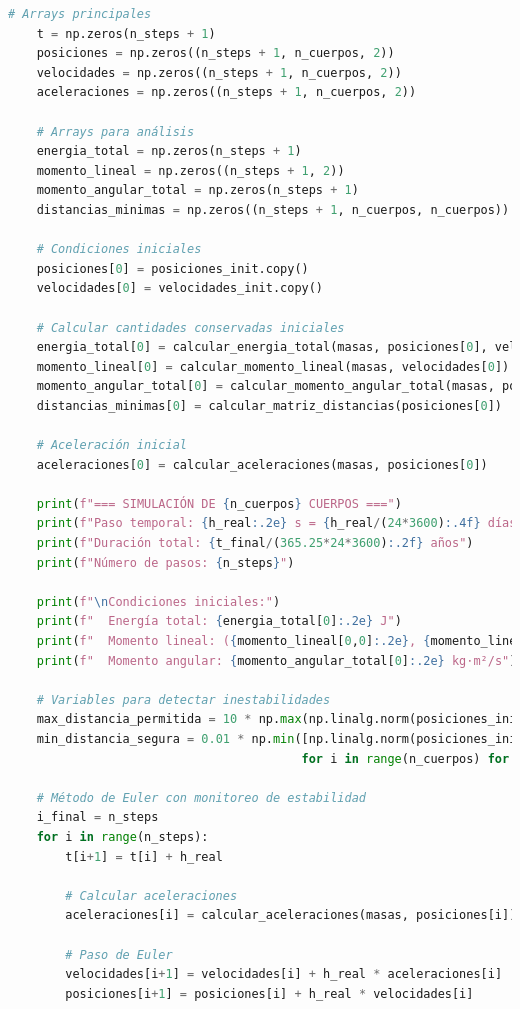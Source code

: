 \documentclass{article}
\begin{document}
\begin{lstlisting}[language=Python, caption={Sistema completo de 4 cuerpos con análisis dinámico}]
    # Arrays principales
    t = np.zeros(n_steps + 1)
    posiciones = np.zeros((n_steps + 1, n_cuerpos, 2))
    velocidades = np.zeros((n_steps + 1, n_cuerpos, 2))
    aceleraciones = np.zeros((n_steps + 1, n_cuerpos, 2))
    
    # Arrays para análisis
    energia_total = np.zeros(n_steps + 1)
    momento_lineal = np.zeros((n_steps + 1, 2))
    momento_angular_total = np.zeros(n_steps + 1)
    distancias_minimas = np.zeros((n_steps + 1, n_cuerpos, n_cuerpos))
    
    # Condiciones iniciales
    posiciones[0] = posiciones_init.copy()
    velocidades[0] = velocidades_init.copy()
    
    # Calcular cantidades conservadas iniciales
    energia_total[0] = calcular_energia_total(masas, posiciones[0], velocidades[0])
    momento_lineal[0] = calcular_momento_lineal(masas, velocidades[0])
    momento_angular_total[0] = calcular_momento_angular_total(masas, posiciones[0], velocidades[0])
    distancias_minimas[0] = calcular_matriz_distancias(posiciones[0])
    
    # Aceleración inicial
    aceleraciones[0] = calcular_aceleraciones(masas, posiciones[0])
    
    print(f"=== SIMULACIÓN DE {n_cuerpos} CUERPOS ===")
    print(f"Paso temporal: {h_real:.2e} s = {h_real/(24*3600):.4f} días")
    print(f"Duración total: {t_final/(365.25*24*3600):.2f} años")
    print(f"Número de pasos: {n_steps}")
    
    print(f"\nCondiciones iniciales:")
    print(f"  Energía total: {energia_total[0]:.2e} J")
    print(f"  Momento lineal: ({momento_lineal[0,0]:.2e}, {momento_lineal[0,1]:.2e}) kg⋅m/s")
    print(f"  Momento angular: {momento_angular_total[0]:.2e} kg⋅m²/s")
    
    # Variables para detectar inestabilidades
    max_distancia_permitida = 10 * np.max(np.linalg.norm(posiciones_init, axis=1))
    min_distancia_segura = 0.01 * np.min([np.linalg.norm(posiciones_init[i] - posiciones_init[j]) 
                                         for i in range(n_cuerpos) for j in range(i+1, n_cuerpos)])
    
    # Método de Euler con monitoreo de estabilidad
    i_final = n_steps
    for i in range(n_steps):
        t[i+1] = t[i] + h_real
        
        # Calcular aceleraciones
        aceleraciones[i] = calcular_aceleraciones(masas, posiciones[i])
        
        # Paso de Euler
        velocidades[i+1] = velocidades[i] + h_real * aceleraciones[i]
        posiciones[i+1] = posiciones[i] + h_real * velocidades[i]
        

\end{lstlisting}
\end{document}
